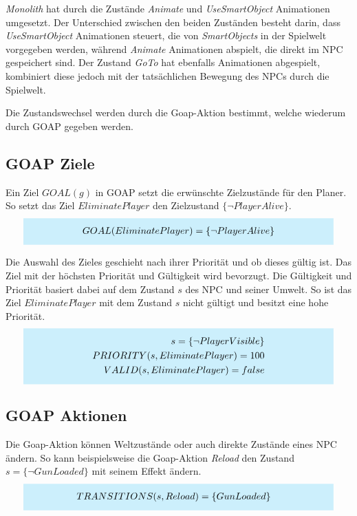\textit{Monolith} hat durch die Zustände \textit{Animate} und \textit{UseSmartObject} Animationen umgesetzt. Der Unterschied zwischen den beiden Zuständen besteht darin, dass \textit{UseSmartObject} Animationen steuert, die von \textit{SmartObjects} in der Spielwelt vorgegeben werden, während \textit{Animate} Animationen abspielt, die direkt im NPC gespeichert sind. Der Zustand \textit{GoTo} hat ebenfalls Animationen abgespielt, kombiniert diese jedoch mit der tatsächlichen Bewegung des NPCs durch die Spielwelt.

Die Zustandswechsel werden durch die Goap-Aktion bestimmt, welche wiederum durch GOAP gegeben werden.


\subsection{GOAP Ziele}
\label{chap:goap ziele}

Ein Ziel $GOAL(g)$ in GOAP setzt die erwünschte Zielzustände für den Planer. So setzt das Ziel $EliminatePlayer$ den Zielzustand $\{\lnot PlayerAlive\}$.
\[
	\highlightbox{0.9\textwidth}{$
		\begin{align*}
			GOAL(EliminatePlayer) = \{\lnot PlayerAlive\}
		\end{align*}
	$}
\]

Die Auswahl des Zieles geschieht nach ihrer Priorität und ob dieses gültig ist. Das Ziel mit der höchsten Priorität und Gültigkeit wird bevorzugt. Die Gültigkeit und Priorität basiert dabei auf dem Zustand $s$ des NPC und seiner Umwelt. So ist das Ziel $EliminatePlayer$ mit dem Zustand $s$ nicht gültigt und besitzt eine hohe Priorität.
\[
	\highlightbox{0.9\textwidth}{$
		\begin{align*}
			s = \{\lnot PlayerVisible\} \\
			PRIORITY(s,EliminatePlayer) = 100 \\
			VALID(s,EliminatePlayer) = false
		\end{align*}
	$}
\]


\subsection{GOAP Aktionen}
\label{chap:goap actions}

Die Goap-Aktion können Weltzustände oder auch direkte Zustände eines NPC ändern. So kann beispielsweise die Goap-Aktion \textit{Reload} den Zustand $s = \{\lnot GunLoaded\}$ mit seinem Effekt ändern.
\[
	\highlightbox{0.9\textwidth}{$
		\begin{align*}
			TRANSITIONS(s,Reload) &= \{GunLoaded\}
		\end{align*}
	$}
\]

